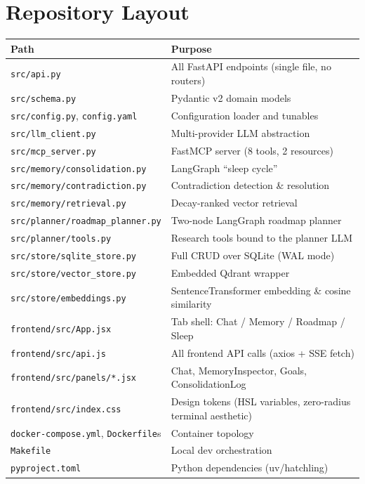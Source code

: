 \documentclass[11pt,a4paper]{report}
\newcommand{\file}[1]{\texttt{\small\color{accent!70!black}#1}}
\begin{document}
\section{Repository Layout}

\begin{longtable}{L{5.1cm}L{8.6cm}}
\toprule
\textbf{Path} & \textbf{Purpose} \\
\midrule
\endhead
\file{src/api.py} & All FastAPI endpoints (single file, no routers) \\
\file{src/schema.py} & Pydantic v2 domain models \\
\file{src/config.py}, \file{config.yaml} & Configuration loader and tunables \\
\file{src/llm\_client.py} & Multi-provider LLM abstraction \\
\file{src/mcp\_server.py} & FastMCP server (8 tools, 2 resources) \\
\file{src/memory/consolidation.py} & LangGraph ``sleep cycle'' \\
\file{src/memory/contradiction.py} & Contradiction detection \& resolution \\
\file{src/memory/retrieval.py} & Decay-ranked vector retrieval \\
\file{src/planner/roadmap\_planner.py} & Two-node LangGraph roadmap planner \\
\file{src/planner/tools.py} & Research tools bound to the planner LLM \\
\file{src/store/sqlite\_store.py} & Full CRUD over SQLite (WAL mode) \\
\file{src/store/vector\_store.py} & Embedded Qdrant wrapper \\
\file{src/store/embeddings.py} & SentenceTransformer embedding \& cosine similarity \\
\file{frontend/src/App.jsx} & Tab shell: Chat / Memory / Roadmap / Sleep \\
\file{frontend/src/api.js} & All frontend API calls (axios + SSE fetch) \\
\file{frontend/src/panels/*.jsx} & Chat, MemoryInspector, Goals, ConsolidationLog \\
\file{frontend/src/index.css} & Design tokens (HSL variables, zero-radius terminal aesthetic) \\
\file{docker-compose.yml}, \file{Dockerfile}s & Container topology \\
\file{Makefile} & Local dev orchestration \\
\file{pyproject.toml} & Python dependencies (uv/hatchling) \\
\bottomrule
\end{longtable}
\end{document}
